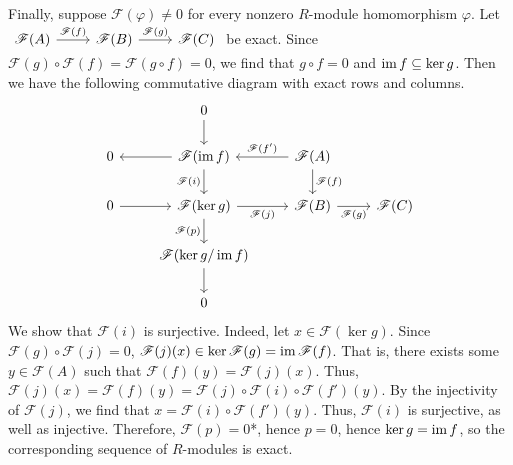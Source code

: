 \documentclass[../../master.tex]{subfiles}
\begin{document}
\begin{solution}
    Finally, suppose $\mathscr{F}(\varphi) \neq 0$ for every nonzero $R$-module homomorphism $\varphi$.
    Let
    $
    \begin{tikzcd}
        {\mathscr{F}(A)} & {\mathscr{F}(B)} & {\mathscr{F}(C)}
        \arrow["\mathscr{F}(f)", from=1-1, to=1-2]
        \arrow["\mathscr{F}(g)", from=1-2, to=1-3] 
    \end{tikzcd}
    $
    be exact.
    Since $\mathscr{F}(g) \circ \mathscr{F}(f) = \mathscr{F}(g \circ f) = 0$, we find that $g \circ f = 0$ and $\operatorname{im} f \subseteq \ker g$.
    Then we have the following commutative diagram with exact rows and columns.
    \[
    \begin{tikzcd}
	& 0 \\
	0 & {\mathscr{F} (\im f)} & {\mathscr{F}(A)} \\
	0 & {\mathscr{F}(\ker g)} & {\mathscr{F}(B)} & {\mathscr{F}(C)} \\
	& {\mathscr{F}(\ker g / \im f)} \\
	& 0
	\arrow[from=1-2, to=2-2]
	\arrow["{\mathscr{F}(i)}"', from=2-2, to=3-2]
	\arrow["{\mathscr{F}(p)}"', from=3-2, to=4-2]
	\arrow[from=4-2, to=5-2]
	\arrow[from=3-1, to=3-2]
	\arrow["{\mathscr{F}(j)}"', from=3-2, to=3-3]
	\arrow["{\mathscr{F}(g)}"', from=3-3, to=3-4]
	\arrow["{\mathscr{F}(f)}", from=2-3, to=3-3]
	\arrow[from=2-2, to=2-1]
	\arrow["{\mathscr{F}(f')}"', from=2-3, to=2-2]
    \end{tikzcd}
   \]
   We show that $\mathscr{F}(i)$ is surjective.
   Indeed, let $x \in \mathscr{F}(\ker g)$.
   Since $\mathscr{F}(g) \circ \mathscr{F}(j) = 0$,  $\mathscr{F}(j)(x) \in \ker \mathscr{F}(g) = \operatorname{im} \mathscr{F}(f)$.
   That is, there exists some $y \in \mathscr{F}(A)$ such that $\mathscr{F}(f)(y) = \mathscr{F}(j)(x)$.
   Thus, $\mathscr{F}(j)(x) = \mathscr{F}(f)(y) = \mathscr{F}(j) \circ \mathscr{F}(i) \circ \mathscr{F}(f')(y)$.
   By the injectivity of $\mathscr{F}(j)$, we find that $x = \mathscr{F}(i) \circ \mathscr{F}(f')(y)$.
   Thus, $\mathscr{F}(i)$ is surjective, as well as injective.
   Therefore, $\mathscr{F}(p) = 0$*, hence $p = 0$, hence $\ker g = \operatorname{im} f$, so the corresponding sequence of $R$-modules is exact. 
\end{solution}
\end{document}
